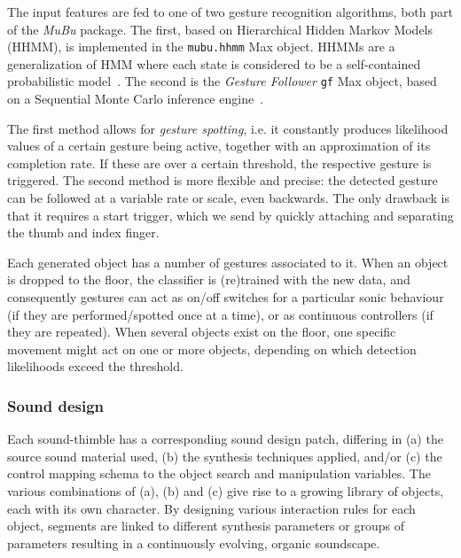\documentclass{nime-alternate}
\begin{document}
The input features are fed to one of two gesture recognition algorithms, both part of the \textit{MuBu} package. The first, based on Hierarchical Hidden Markov Models (HHMM), is implemented in the \texttt{mubu.hhmm} Max object. HHMMs are a generalization of HMM where each state is considered to be a self-contained probabilistic model~\cite{probabilisticmodels,hhmm}. The second is the \textit{Gesture Follower} \texttt{gf} Max object, based on a Sequential Monte Carlo inference engine~\cite{caramiaux2015adaptive}. 

The first method allows for \textit{gesture spotting}, i.e. it constantly produces likelihood values of a certain gesture being active, together with an approximation of its completion rate. If these are over a certain threshold, the respective gesture is triggered. The second method is more flexible and precise: the detected gesture can be followed at a variable rate or scale, even backwards. The only drawback is that it requires a start trigger, which we send by quickly attaching and separating the thumb and index finger.

Each generated object has a number of gestures associated to it. When an object is dropped to the floor, the classifier is (re)trained with the new data, and consequently gestures can act as on/off switches for a particular sonic behaviour (if they are performed/spotted once at a time), or as continuous controllers (if they are repeated). When several objects exist on the floor, one specific movement might act on one or more objects, depending on which detection likelihoods exceed the threshold. 


\subsubsection{Sound design}


Each sound-thimble has a corresponding sound design patch, differing in (a) the source sound material used, (b) the synthesis techniques applied, and/or (c) the control mapping schema to the object search and manipulation variables. The various combinations of (a), (b) and (c) give rise to a growing library of objects, each with its own character. By designing various interaction rules for each object, segments are linked to different synthesis parameters or groups of parameters resulting in a continuously evolving, organic soundscape.
\end{document}
